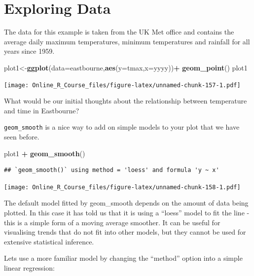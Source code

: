 \documentclass[]{book}
\newenvironment{Shaded}{\begin{snugshade}}{\end{snugshade}}
\newcommand{\DataTypeTok}[1]{\textcolor[rgb]{0.13,0.29,0.53}{#1}}
\newcommand{\KeywordTok}[1]{\textcolor[rgb]{0.13,0.29,0.53}{\textbf{#1}}}
\newcommand{\NormalTok}[1]{#1}
\newcommand{\OperatorTok}[1]{\textcolor[rgb]{0.81,0.36,0.00}{\textbf{#1}}}
\newcommand{\StringTok}[1]{\textcolor[rgb]{0.31,0.60,0.02}{#1}}
\begin{document}
\hypertarget{exploring-data}{%
\section{Exploring Data}\label{exploring-data}}

The data for this example is taken from the UK Met office and contains the average daily maximum temperatures, minimum temperatures and rainfall for all years since 1959.

\begin{Shaded}
\begin{Highlighting}[]
\NormalTok{plot1<-}\KeywordTok{ggplot}\NormalTok{(}\DataTypeTok{data=}\NormalTok{eastbourne,}\KeywordTok{aes}\NormalTok{(}\DataTypeTok{y=}\NormalTok{tmax,}\DataTypeTok{x=}\NormalTok{yyyy))}\OperatorTok{+}
\StringTok{  }\KeywordTok{geom_point}\NormalTok{()}
\NormalTok{plot1}
\end{Highlighting}
\end{Shaded}

\texttt{[image: Online\_R\_Course\_files/figure-latex/unnamed-chunk-157-1.pdf]}

What would be our initial thoughts about the relationship between temperature and time in Eastbourne?

\texttt{geom\_smooth} is a nice way to add on simple models to your plot that we have seen before.

\begin{Shaded}
\begin{Highlighting}[]
\NormalTok{plot1 }\OperatorTok{+}
\StringTok{    }\KeywordTok{geom_smooth}\NormalTok{()}
\end{Highlighting}
\end{Shaded}

\begin{verbatim}
## `geom_smooth()` using method = 'loess' and formula 'y ~ x'
\end{verbatim}

\texttt{[image: Online\_R\_Course\_files/figure-latex/unnamed-chunk-158-1.pdf]}

The default model fitted by geom\_smooth depends on the amount of data being plotted. In this case it has told us that it is using a ``loess'' model to fit the line - this is a simple form of a moving average smoother. It can be useful for visualising trends that do not fit into other models, but they cannot be used for extensive statistical inference.

Lets use a more familiar model by changing the ``method'' option into a simple linear regression:
\end{document}

